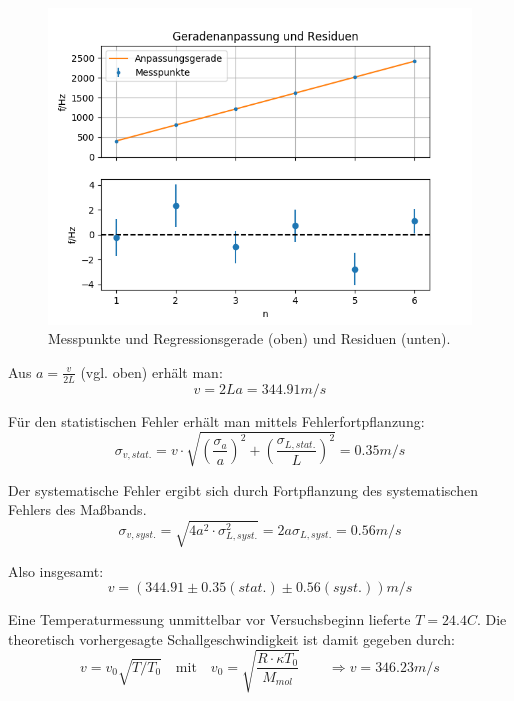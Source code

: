 \documentclass[12pt,a4paper]{article}
\begin{document}
\begin{figure}
	\includegraphics[width=\linewidth]{fitplot}
	\caption[Auswertung Resonanz]{Messpunkte und Regressionsgerade (oben) und
		Residuen (unten).}
	\label{fig:resonanzregression}
\end{figure}


Aus $a=\frac{v}{2L}$ (vgl. oben) erhält man:
\begin{equation}
v=2La=344.91 m/s
\end{equation}

Für den statistischen Fehler erhält man mittels Fehlerfortpflanzung:
\begin{equation}
\sigma_{v,stat.}=v \cdot \sqrt{(\frac{\sigma_a}{a})^2+		(\frac{\sigma_{L,stat.}}{L})^2}=0.35 m/s
\end{equation}

Der systematische Fehler ergibt sich durch Fortpflanzung des systematischen Fehlers des Maßbands.
\begin{equation}
\sigma_{v,syst.}=\sqrt{4a^2 \cdot \sigma_{L,syst.}^2}		=2a \sigma_{L,syst.}=0.56 m/s
\end{equation}

Also insgesamt:
\begin{equation}
v=(344.91 \pm 0.35(stat.) \pm 0.56(syst.))m/s
\end{equation}

Eine Temperaturmessung unmittelbar vor Versuchsbeginn lieferte $T=24.4 C$. Die theoretisch vorhergesagte Schallgeschwindigkeit ist damit gegeben durch:
\begin{equation}
v=v_0 \sqrt{T/T_0} \quad \text{mit} \quad v_0=\sqrt{\frac{R \cdot \kappa T_0}			{M_{mol}}}
\qquad
\Rightarrow v=346.23 m/s
\end{equation}
\end{document}
